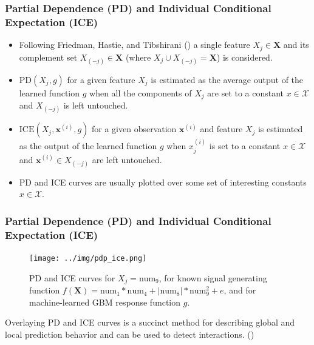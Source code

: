 \documentclass[11pt,aspectratio=169,hyperref={colorlinks}]{beamer}
\begin{document}
	\begin{frame}
	
		\frametitle{Partial Dependence (PD) and Individual Conditional Expectation (ICE)}
		
		\vspace{-10 pt}
		
		\begin{itemize}
			
			\item Following Friedman, Hastie, and Tibshirani (\citeyear{esl}) a single feature $X_j \in \mathbf{X}$ and its complement set $X_{(-j)} \in \mathbf{X}$ (where $X_j \cup X_{(-j)} = \mathbf{X}$) is considered.
			
			\item $\text{PD}(X_j, g)$ for a given feature $X_j$ is estimated as the average output of the learned function $g$ when all the components of $X_j$ are set to a constant $x \in \mathcal{X}$ and $X_{(-j)}$ is left untouched.
			
			\item $\text{ICE}(X_j, \mathbf{x}^{(i)}, g)$ for a given observation $\mathbf{x}^{(i)}$ and feature $X_j$ is estimated as the output of the learned function $g$ when $x^{(i)}_j$ is set to a constant $x \in \mathcal{X}$ and $\mathbf{x}^{(i)} \in X_{(-j)}$ are left untouched.
			
			\item PD and ICE curves are usually plotted over some set of interesting constants $x \in \mathcal{X}$. 
			
		\end{itemize}
		
	\end{frame}
	
	\begin{frame}[t]
		
		\frametitle{Partial Dependence (PD) and Individual Conditional Expectation (ICE)}
		
		\begin{figure}[htb]
			\begin{center}
				\texttt{[image: ../img/pdp\_ice.png]}
				\label{fig:pdp_ice}
				\caption{PD and ICE curves for $ X_j = \text{num}_9$, for known signal generating function $f(\mathbf{X}) = \text{num} _1 * \text{num}_4 + |\text{num}_8| * \text{num}_9^2 + e$, and for machine-learned GBM response function $g$.}
			\end{center}
		\end{figure}
		
		\vspace{-10pt}
		
		Overlaying PD and ICE curves is a succinct method for describing global and local prediction behavior and can be used to detect interactions. (\cite{ice_plots}) 
		
	\end{frame}
\end{document}

